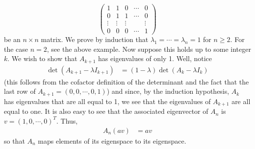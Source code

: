 \documentclass{article}
\begin{document}
\begin{itemize}
\[\begin{pmatrix}
        1 & 1 & 0 & \cdots &0\\
        0 & 1 & 1 & \cdots& 0\\
        \vdots & \vdots & \vdots & & \vdots\\
        0 & 0 & 0 &\cdots & 1
    \end{pmatrix}\]
    be an $n\times n$ matrix. We prove by induction that $\lambda_1 = \cdots = \lambda_n = 1$ for $n \geq 2$. For the case $n = 2$, see the above example. Now suppose this holds up to some integer $k$. We wish to show that $A_{k+1}$ has eigenvalues of only 1. Well, notice
    \begin{align*}
        \det{(A_{k+1} - \lambda I_{k+1})} &= (1 - \lambda) \det{(A_k - \lambda I_k)}
    \end{align*}
    (this follows from the cofactor definition of the determinant and the fact that the last row of $A_{k+1} = (0,0,\cdots, 0,1)$) and since, by the induction hypothesis, $A_k$ has eigenvalues that are all equal to 1, we see that the eigenvalues of $A_{k+1}$ are all equal to one.
    \newline
    It is also easy to see that the associated eigenvector of $A_n$ is $v = (1,0, \cdots, 0)^T$. Thus, 
    \begin{align*}
        A_n(av) &= av
    \end{align*}
    so that $A_n$ maps elements of its eigenspace to its eigenspace.
\end{itemize}
\end{document}
